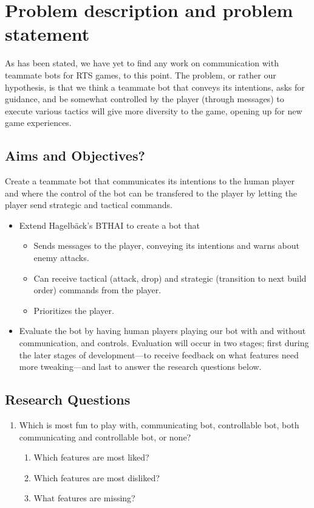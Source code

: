 \chapter{Problem description and problem statement}
As has been stated, we have yet to find any work on communication with teammate bots for RTS games, to this point. The problem, or rather our hypothesis, is that we think a teammate bot that conveys its intentions, asks for guidance, and be somewhat controlled by the player (through messages) to execute various tactics will give more diversity to the game, opening up for new game experiences.

\section{Aims and Objectives?}
Create a teammate bot that communicates its intentions to the human player and where the control of the bot can be transfered to the player by letting the player send strategic and tactical commands.
\begin{itemize}
	\item Extend Hagelbäck's BTHAI\cite{bthai} to create a bot that
	\begin{itemize}
		\item Sends messages to the player, conveying its intentions and warns about enemy attacks.
		\item Can receive tactical (attack, drop) and strategic (transition to next build order) commands from the player.
		\item Prioritizes the player. 
	\end{itemize}
	\item Evaluate the bot by having human players playing our bot with and without communication, and controls. Evaluation will occur in two stages; first during the later stages of development—to receive feedback on what features need more tweaking—and last to answer the research questions below.
\end{itemize}

\section{Research Questions}
\renewcommand{\theenumii}{\arabic{enumi}.\arabic{enumii}}
\renewcommand{\labelenumii}{\theenumii.}
\begin{enumerate}
	\item	Which is most fun to play with, communicating bot, controllable bot, both communicating and controllable bot, or none?
	\begin{enumerate}
		\item Which features are most liked?
		\item Which features are most disliked?
		\item What features are missing?
	\end{enumerate}
\end{enumerate}


